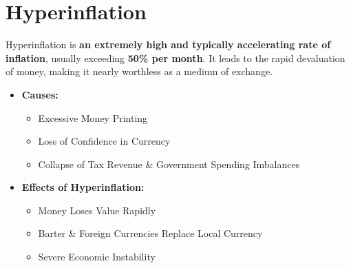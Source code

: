 \documentclass[a4paper, 11pt]{article}
\begin{document}
\section{Hyperinflation}
Hyperinflation is \textbf{an extremely high and typically accelerating rate of inflation}, usually exceeding \textbf{50\% per month}. It leads to the rapid devaluation of money, making it nearly worthless as a medium of exchange.
\begin{itemize}
    \item \textbf{Causes:}
    \begin{itemize}
        \item Excessive Money Printing
        \item Loss of Confidence in Currency
        \item Collapse of Tax Revenue \& Government Spending Imbalances
    \end{itemize}
    \item \textbf{Effects of Hyperinflation:}
    \begin{itemize}
        \item Money Loses Value Rapidly
        \item Barter \& Foreign Currencies Replace Local Currency
        \item Severe Economic Instability
    \end{itemize}
\end{itemize}
\end{document}
